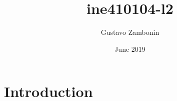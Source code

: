\documentclass{article}
\title{ine410104-l2}
\author{Gustavo Zambonin}
\date{June 2019}
\begin{document}
\maketitle

\section{Introduction}
\end{document}
